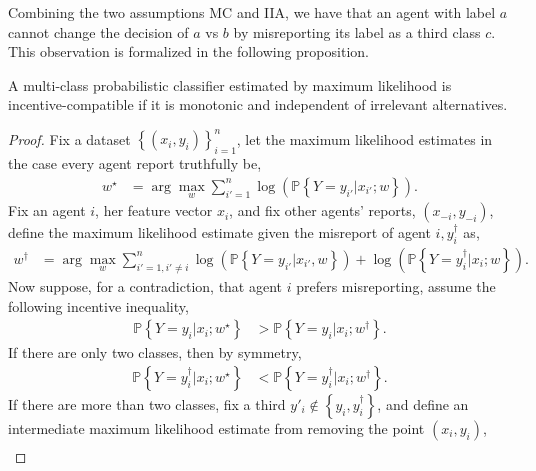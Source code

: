 \documentclass{article}
\begin{document}
\newline \newline
Combining the two assumptions MC and IIA, we have that an agent with label $a $ cannot change the decision of $a $ vs $b $ by misreporting its label as a third class $c $. This observation is formalized in the following proposition.
\newline \newline
\begin{thm} \label{thm:margin} 
A multi-class probabilistic classifier estimated by maximum likelihood is incentive-compatible if it is monotonic and independent of irrelevant alternatives.
\end{thm}
\begin{proof} \label{proof:marginpf} 
Fix a dataset $\left\{\left(x_{i}, y_{i}\right)\right\}_{i=1}^{n}$, let the maximum likelihood estimates in the case every agent report truthfully be,
\begin{align*}
w^\star  &= \arg\displaystyle\max_{w} \displaystyle\sum_{i'=1}^{n} \log\left(\mathbb{P}\left\{Y = y_{i'} | x_{i'} ; w\right\}\right).
\end{align*}
Fix an agent $i $, her feature vector $x_{i}$, and fix other agents' reports, $\left(x_{-i}, y_{-i}\right)$, define the maximum likelihood estimate given the misreport of agent $i , y^{\dagger}_{i}$ as,
\begin{align*}
w^{\dagger} &= \arg\displaystyle\max_{w} \displaystyle\sum_{i'=1, i' \neq  i}^{n} \log\left(\mathbb{P}\left\{Y = y_{i'} | x_{i'}, w\right\}\right) + \log\left(\mathbb{P}\left\{Y = y^{\dagger}_{i} | x_{i} ; w\right\}\right).
\end{align*}
Now suppose, for a contradiction, that agent $i $ prefers misreporting, assume the following incentive inequality,
\begin{align*}
\mathbb{P}\left\{Y = y_{i} | x_{i} ; w^\star \right\} &> \mathbb{P}\left\{Y = y_{i} | x_{i} ; w^{\dagger}\right\}.
\end{align*}
If there are only two classes, then by symmetry,
\begin{align*}
\mathbb{P}\left\{Y = y^{\dagger}_{i} | x_{i} ; w^\star \right\} &< \mathbb{P}\left\{Y = y^{\dagger}_{i} | x_{i} ; w^{\dagger}\right\}.
\end{align*}
If there are more than two classes, fix a third $y'_{i} \notin \left\{y_{i}, y^{\dagger}_{i}\right\}$, and define an intermediate maximum likelihood estimate from removing the point $\left(x_{i}, y_{i}\right)$,
\begin{align*}

\end{align*}
\end{proof}
\end{document}

